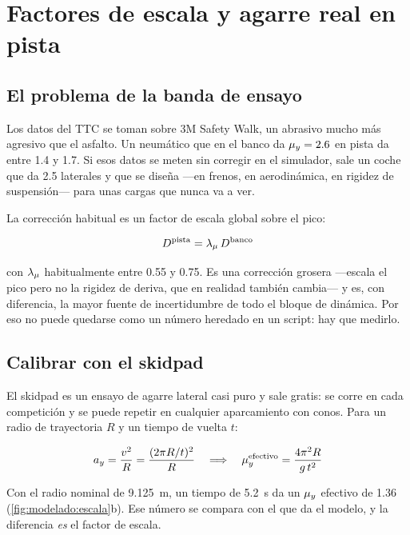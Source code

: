 \section{Factores de escala y agarre real en pista}
\label{sec:modelado_neumatico:05}

\subsection{El problema de la banda de ensayo}

Los datos del TTC se toman sobre 3M Safety Walk, un abrasivo mucho más agresivo
que el asfalto. Un neumático que en el banco da $\mu_y = \num{2.6}$ en pista da
entre \num{1.4} y \num{1.7}. Si esos datos se meten sin corregir en el simulador,
sale un coche que da \SI{2.5}{\gacc} laterales y que se diseña ---en frenos, en
aerodinámica, en rigidez de suspensión--- para unas cargas que nunca va a ver.

La corrección habitual es un factor de escala global sobre el pico:

\begin{equation}
  D^{\text{pista}} = \lambda_{\mu} \, D^{\text{banco}}
  \label{eq:factor_escala}
\end{equation}

con $\lambda_{\mu}$ habitualmente entre \num{0.55} y \num{0.75}. Es una corrección
grosera ---escala el pico pero no la rigidez de deriva, que en
realidad también cambia--- y es, con diferencia, la mayor fuente de incertidumbre
de todo el bloque de dinámica. Por eso no puede quedarse como un número heredado
en un script: hay que medirlo.

\subsection{Calibrar con el skidpad}

El skidpad es un ensayo de agarre lateral casi puro y sale gratis: se corre en
cada competición y se puede repetir en cualquier aparcamiento con conos. Para un
radio de trayectoria $R$ y un tiempo de vuelta $t$:

\begin{equation}
  a_y = \frac{v^2}{R} = \frac{(2\pi R/t)^2}{R}
  \quad\Longrightarrow\quad
  \mu_y^{\text{efectivo}} = \frac{4\pi^2 R}{g\,t^2}
  \label{eq:skidpad}
\end{equation}

Con el radio nominal de \SI{9.125}{\meter}, un tiempo de \SI{5.2}{\second} da un
$\mu_y$ efectivo de \num{1.36} (\cref{fig:modelado:escala}b). Ese número se
compara con el que da el modelo, y la diferencia \emph{es} el factor de escala.

